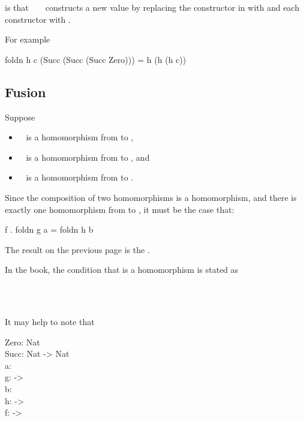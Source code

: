 \documentclass{seminar}
\begin{document}
\begin{slide}
is that ~  ~ constructs a new value by replacing the
 constructor in  with  and each 
constructor with .

For example

\begin{code}
foldn h c (Succ (Succ (Succ Zero))) = h (h (h c))
\end{code}

\newpage

\subsection{Fusion}

Suppose

\begin{itemize}
\item {} ~ is a homomorphism from 
to ,
\item {} ~ is a homomorphism from 
to , and
\item {} ~ is a homomorphism from 
to .
\end{itemize}

Since the composition of two homomorphisms is a homomorphism,
and there is exactly one homomorphism from
\newline
{}
to , it must be the case that:

\begin{code}
f . foldn g a = foldn h b
\end{code}

\newpage

The result on the previous page is the .

In the book, the condition that  is a homomorphism is stated as

\begin{codenott}
 \color{black}{is strict}\\
\\
\end{codenott}

It may help to note that

\begin{code}
Zero: Nat\\
Succ: Nat -> Nat\\[1.5ex]
a: \\
g:  -> \\[1.5ex]
b: \\
h:  -> \\[1.5ex]
f:  -> \\
\end{code}


\end{slide}
\end{document}
